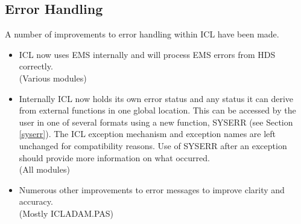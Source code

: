 \subsection{Error Handling}
\label{errs}
A number of improvements to error handling within ICL have been made.
\begin{itemize}
\item ICL now uses EMS internally and will process EMS
errors from HDS correctly.\\
(Various modules)
\item Internally ICL now holds its own error status and any status it can
derive from external functions in one global location.
This can be accessed by the user in
one of several formats using a new function, SYSERR (see
Section \ref{syserr}). The ICL exception
mechanism and exception names are left unchanged for compatibility reasons.
Use
of SYSERR after an exception should provide more information on what
occurred.\\
(All modules)
\item Numerous other improvements to error messages to improve clarity and
accuracy.\\
(Mostly ICLADAM.PAS)
\end{itemize}

